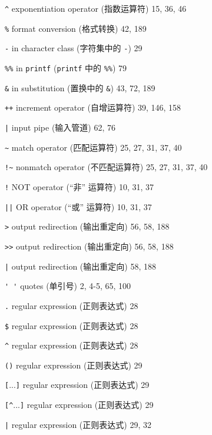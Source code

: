 \begin{multicols}{2}
\hangindent=2pc  \verb'^' exponentiation operator (指数运算符) 15, 36, 46

\hangindent=2pc  \verb'%' format conversion (格式转换) 42, 189

\hangindent=2pc  \verb'-' in character class (字符集中的
\verb'-') 29

\hangindent=2pc  \verb'%%' in \verb'printf' (\verb'printf' 中的
\verb'%%') 79

\hangindent=2pc  \verb'&' in substitution (置换中的
\verb'&') 43, 72, 189

\hangindent=2pc  \verb'++' increment operator (自增运算符) 39, 146, 158

\hangindent=2pc  \verb'|' input pipe (输入管道) 62, 76

\hangindent=2pc  \verb'~' match operator (匹配运算符) 25, 27, 31, 37, 40

\hangindent=2pc  \verb'!~' nonmatch operator (不匹配运算符) 25, 27, 31, 37, 40

\hangindent=2pc  \verb'!' NOT operator (``非'' 运算符) 10, 31, 37

\hangindent=2pc  \verb'||' OR operator (``或'' 运算符) 10, 31, 37

\hangindent=2pc  \verb'>' output redirection (输出重定向) 56, 58, 188

\hangindent=2pc  \verb'>>' output redirection (输出重定向) 56, 58, 188

\hangindent=2pc  \verb'|' output redirection (输出重定向) 58, 188

\hangindent=2pc  \verb"' '" quotes (单引号) 2, 4-5, 65, 100

\hangindent=2pc  \verb'.' regular expression (正则表达式) 28

\hangindent=2pc  \verb'$' regular expression (正则表达式) 28

\hangindent=2pc  \verb'^' regular expression (正则表达式) 28

\hangindent=2pc  \verb'()' regular expression (正则表达式) 29

\hangindent=2pc  \verb'['...\verb']' regular expression
(正则表达式) 29

\hangindent=2pc  \verb'[^'...\verb']' regular expression
(正则表达式) 29

\hangindent=2pc  \verb'|' regular expression (正则表达式) 29, 32


\end{multicols}
